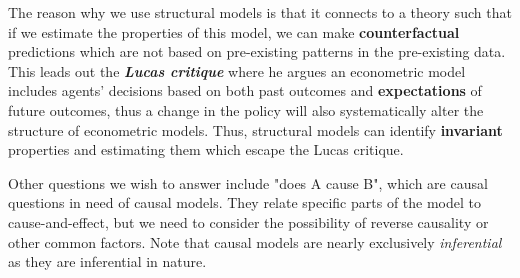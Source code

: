 The reason why we use structural models is that it connects to a theory such that if we estimate the properties of this model, we can make \textbf{counterfactual} predictions which are not based on pre-existing patterns in the pre-existing data. This leads out the \textbf{\textit{Lucas critique}} where he argues an econometric model includes agents' decisions based on both past outcomes and \textbf{expectations} of future outcomes, thus a change in the policy will also systematically alter the structure of econometric models. Thus, structural models can identify \textbf{invariant} properties and estimating them which escape the Lucas critique.

Other questions we wish to answer include "does A cause B", which are causal questions in need of causal models. They relate specific parts of the model to cause-and-effect, but we need to consider the possibility of reverse causality or other common factors. Note that causal models are nearly exclusively \textit{inferential} as they are inferential in nature.

\newpage